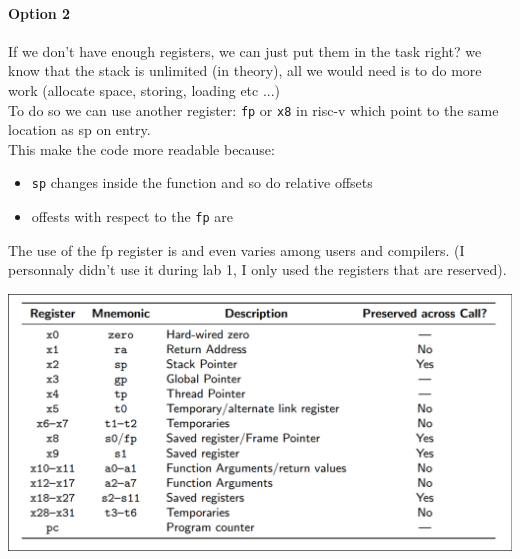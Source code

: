 \paragraph{Option 2}
If we don't have enough registers, we can just put them in the task right? we know that the stack is unlimited (in theory), all we would need is to do more work (allocate space, storing, loading etc ...)\\
To do so we can use another register: \texttt{fp} or \texttt{x8} in risc-v which point to the same location as sp on entry. \\
This make the code more readable because:
\begin{itemize}
	\item \texttt{sp} changes inside the function and so do relative offsets 
	\item offests with respect to the \texttt{fp} are 
\end{itemize}
The use of the fp register is  and even varies among users and compilers. (I personnaly didn't use it during lab 1, I only used the registers that are reserved).\\
\begin{center}
\includegraphics[scale=0.3]{screenshots/2025-10-11_7.png}
\end{center}

















